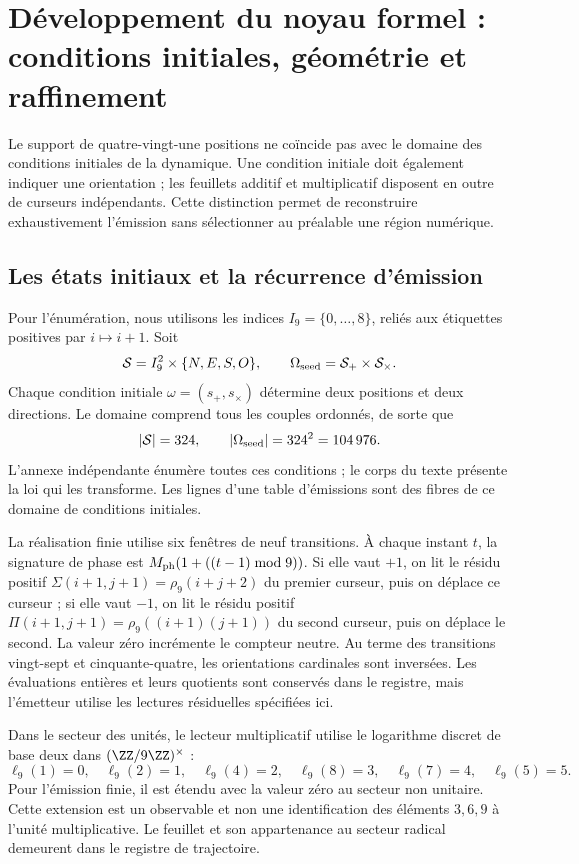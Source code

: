 \section{Développement du noyau formel : conditions initiales, géométrie et raffinement}
\label{sec:extension}

Le support de quatre-vingt-une positions ne coïncide pas avec le domaine des conditions initiales de la dynamique. Une condition initiale doit également indiquer une orientation ; les feuillets additif et multiplicatif disposent en outre de curseurs indépendants. Cette distinction permet de reconstruire exhaustivement l’émission sans sélectionner au préalable une région numérique.

\subsection{Les états initiaux et la récurrence d’émission}

Pour l’énumération, nous utilisons les indices \(I_9=\{0,\ldots,8\}\), reliés aux étiquettes positives par \(i\mapsto i+1\). Soit
\[
 \mathcal S=I_9^2\times\{N,E,S,O\},\qquad
 \Omega_{\rm seed}=\mathcal S_+\times\mathcal S_\times.
\]
Chaque condition initiale \(\omega=(s_+,s_\times)\) détermine deux positions et deux directions. Le domaine comprend tous les couples ordonnés, de sorte que
\begin{equation}
 |\mathcal S|=324,\qquad |\Omega_{\rm seed}|=324^2=104\,976.
 \label{eq:semillas}
\end{equation}
L’annexe indépendante énumère toutes ces conditions ; le corps du texte présente la loi qui les transforme. Les lignes d’une table d’émissions sont des fibres de ce domaine de conditions initiales.

La réalisation finie utilise six fenêtres de neuf transitions. À chaque instant \(t\), la signature de phase est \(M_{\rm ph}(1+((t-1)\bmod9))\). Si elle vaut \(+1\), on lit le résidu positif \(\Sigma(i+1,j+1)=\rho_9(i+j+2)\) du premier curseur, puis on déplace ce curseur ; si elle vaut \(-1\), on lit le résidu positif \(\Pi(i+1,j+1)=\rho_9((i+1)(j+1))\) du second curseur, puis on déplace le second. La valeur zéro incrémente le compteur neutre. Au terme des transitions vingt-sept et cinquante-quatre, les orientations cardinales sont inversées. Les évaluations entières et leurs quotients sont conservés dans le registre, mais l’émetteur utilise les lectures résiduelles spécifiées ici.

Dans le secteur des unités, le lecteur multiplicatif utilise le logarithme discret de base deux dans \((\ZZ/9\ZZ)^\times\) :
\[
 \ell_9(1)=0,\quad\ell_9(2)=1,\quad\ell_9(4)=2,\quad
 \ell_9(8)=3,\quad\ell_9(7)=4,\quad\ell_9(5)=5.
\]
Pour l’émission finie, il est étendu avec la valeur zéro au secteur non unitaire. Cette extension est un observable et non une identification des éléments \(3,6,9\) à l’unité multiplicative. Le feuillet et son appartenance au secteur radical demeurent dans le registre de trajectoire.

